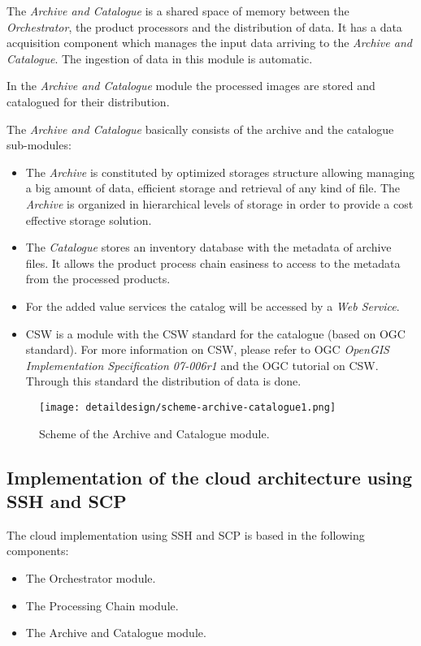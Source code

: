 The \emph{Archive and Catalogue} is a shared space of memory between the
\emph{Orchestrator}, the product processors and the distribution of data. It has
a data acquisition component which manages the input data arriving to the
\emph{Archive and Catalogue}. The ingestion of data in this module is automatic.

In the \emph{Archive and Catalogue} module the processed images are stored and catalogued for their distribution.

The \emph{Archive and Catalogue} basically consists of the archive and the
catalogue sub-modules:
\begin{itemize}
\item The \emph{Archive} is constituted by optimized storages structure allowing managing a big amount of data, efficient storage and retrieval of any kind of file. The \emph{Archive} is organized in hierarchical levels of storage in order to provide a cost effective storage solution.

\item The \emph{Catalogue} stores an inventory database with the metadata of archive files. It allows the product process chain easiness to access to the metadata from the processed products.

\item For the added value services the catalog will be accessed by a \emph{Web Service}.

\item \ac{CSW} is a module with the \ac{CSW} standard for the catalogue (based on \ac{OGC} standard). For more information on \ac{CSW}, please refer to \ac{OGC} \emph{OpenGIS Implementation Specification 07-006r1} and the \ac{OGC} tutorial on \ac{CSW}. Through this standard the distribution of data is done.
\end{itemize}

\begin{figure}[!h]
\begin{center}
\texttt{[image: detaildesign/scheme-archive-catalogue1.png]}
\caption{Scheme of the Archive and Catalogue module.}
\label{fig:archive-catalogue-scheme}
\end{center}
\end{figure}



\subsection{Implementation of the cloud architecture using SSH and SCP}
\label{subsec:ssh-cloud}
The cloud implementation using \ac{SSH} and \ac{SCP} is based in the following
components:
\begin{itemize}
\item The Orchestrator module.
\item The Processing Chain module.
\item The Archive and Catalogue module.
\end{itemize}

